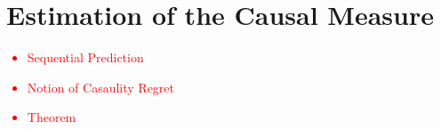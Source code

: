 \section{Estimation of the Causal Measure}

\textcolor{red}
{\begin{itemize}
    \item Sequential Prediction
    \item Notion of Casaulity Regret
    \item Theorem
\end{itemize}}